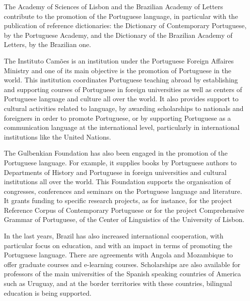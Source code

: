 \begin{multicols}{2}

The Academy of Sciences of Lisbon and the Brazilian Academy of Letters contribute to the promotion of the Portuguese language, 
in particular with the publication of reference dictionaries: the Dictionary of Contemporary Portuguese, by the Portuguese Academy, 
and the Dictionary of the Brazilian Academy of Letters, by the Brazilian one. 

The Instituto Camões is an institution under the Portuguese Foreign Affaires Ministry 
and one of its main objective is the promotion of Portuguese in the world. 
This institution coordinates Portuguese teaching abroad by establishing and supporting  
courses of Portuguese in foreign universities as well as centers of Portuguese language and culture all over the world.
It also provides support to cultural activities related to language, by awarding scholarships to nationals and foreigners in order to promote Portuguese, or by supporting Portuguese as a communication language at the international level, particularly in international institutions like the United Nations. 


The Gulbenkian Foundation \cite{gulbenkian} has also been engaged in the promotion of the Portuguese language.
For example, it supplies books by Portuguese authors to Departments of History and Portuguese in foreign universities and cultural institutions all over the world. 
This Foundation supports the organisation of congresses, conferences and seminars on the Portuguese language and literature. 
It grants funding to specific research projects, as for instance, for the project Reference Corpus of Contemporary Portuguese or for 
the project Comprehensive Grammar of Portuguese, of the Center of Linguistics of the University of Lisbon.

In the last years, Brazil has also increased international cooperation, with particular focus on education, and with an impact in terms
of promoting the Portuguese language. There are agreements with Angola and Mozambique to offer graduate courses and e-learning courses. 
Scholarships are also available for professors of the main universities of the Spanish speaking countries of America such as Uruguay, and at the border territories with these countries, bilingual education is being supported.


\end{multicols}
